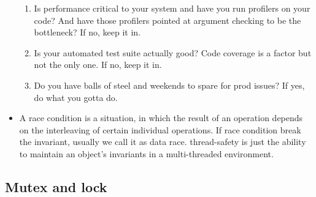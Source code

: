 \documentclass[a4paper,11pt,twoside]{book}
\begin{document}
\begin{itemize}
\begin{enumerate}
		\item Is performance critical to your system and have you run profilers on your code? And have those profilers pointed at argument checking to be the bottleneck? If no, keep it in.
		
		\item Is your automated test suite actually good? Code coverage is a factor but not the only one. If no, keep it in.
		\item Do you have balls of steel and weekends to spare for prod issues? If yes, do what you gotta do.
	\end{enumerate}
	
	\item A race condition is a situation, in which the result of an operation depends on the interleaving of certain individual operations. If race condition break the invariant, usually we call it as data race. thread-safety is just the ability to maintain an object’s invariants in a multi-threaded environment.
\end{itemize}


\subsection{Mutex and lock}
\end{document}
